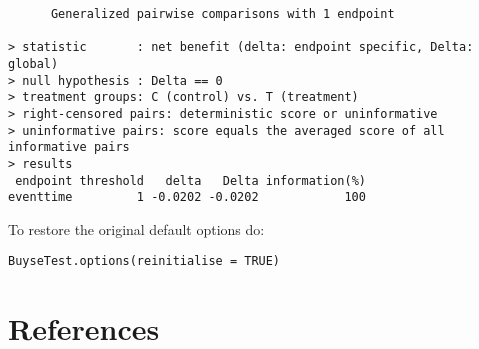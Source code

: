 \documentclass[12pt]{article}
\begin{document}
\begin{verbatim}
      Generalized pairwise comparisons with 1 endpoint

> statistic       : net benefit (delta: endpoint specific, Delta: global) 
> null hypothesis : Delta == 0 
> treatment groups: C (control) vs. T (treatment) 
> right-censored pairs: deterministic score or uninformative
> uninformative pairs: score equals the averaged score of all informative pairs
> results
 endpoint threshold   delta   Delta information(%)
eventtime         1 -0.0202 -0.0202            100
\end{verbatim}


To restore the original default options do:
\lstset{language=r,label= ,caption= ,captionpos=b,numbers=none}
\begin{lstlisting}
BuyseTest.options(reinitialise = TRUE)
\end{lstlisting}

\clearpage


\section*{References}
\label{sec:org1215d6c}
\begingroup
\renewcommand{\section}[2]{}




\endgroup
\end{document}
